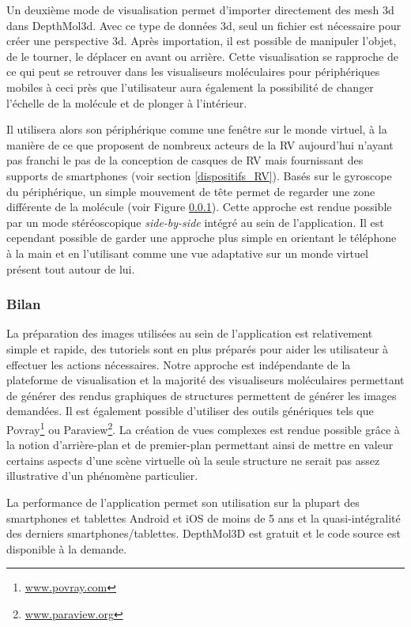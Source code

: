 Un deuxième mode de visualisation permet d'importer directement des mesh 3d dans DepthMol3d. Avec ce type de données 3d, seul un fichier est nécessaire pour créer une perspective 3d. Après importation, il est possible de manipuler l'objet, de le tourner, le déplacer en avant ou arrière. Cette visualisation se rapproche de ce qui peut se retrouver dans les visualiseurs moléculaires pour périphériques mobiles à ceci près que l'utilisateur aura également la possibilité de changer l'échelle de la molécule et de plonger à l'intérieur. 

Il utilisera alors son périphérique comme une fenêtre sur le monde virtuel, à la manière de ce que proposent de nombreux acteurs de la RV aujourd'hui n'ayant pas franchi le pas de la conception de casques de RV mais fournissant des supports de smartphones (voir section \ref{dispositifs_RV}). Basés sur le gyroscope du périphérique, un simple mouvement de tête permet de regarder une zone différente de la molécule (voir Figure \ref{}). Cette approche est rendue possible par un mode stéréoscopique \textit{side-by-side} intégré au sein de l'application. Il est cependant possible de garder une approche plus simple en orientant le téléphone à la main et en l'utilisant comme une vue adaptative sur un monde virtuel présent tout autour de lui.

\subsubsection{Bilan}

La préparation des images utilisées au sein de l'application est relativement simple et rapide, des tutoriels sont en plus préparés pour aider les utilisateur à effectuer les actions nécessaires. Notre approche est indépendante de la plateforme de visualisation et la majorité des visualiseurs moléculaires permettant de générer des rendus graphiques de structures permettent de générer les images demandées. Il est également possible d'utiliser des outils génériques tels que Povray\footnote{\url{www.povray.com}} ou Paraview\footnote{\url{www.paraview.org}}. La création de vues complexes est rendue possible grâce à la notion d'arrière-plan et de premier-plan permettant ainsi de mettre en valeur certains aspects d'une scène virtuelle où la seule structure ne serait pas assez illustrative d'un phénomène particulier.

La performance de l'application permet son utilisation sur la plupart des smartphones et tablettes Android et iOS de moins de 5 ans et la quasi-intégralité des derniers smartphones/tablettes. DepthMol3D est gratuit et le code source est disponible à la demande.

